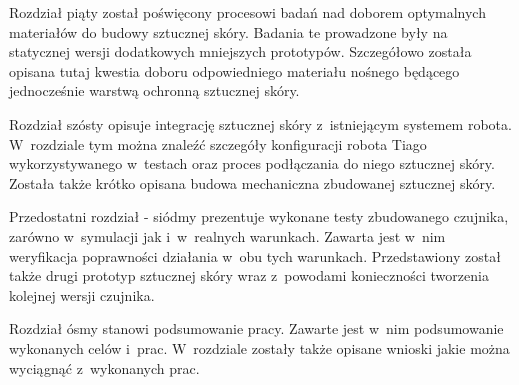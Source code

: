 
Rozdział piąty został poświęcony procesowi badań nad doborem optymalnych materiałów do budowy sztucznej skóry. Badania te prowadzone były na statycznej wersji dodatkowych mniejszych prototypów. Szczegółowo została opisana tutaj kwestia doboru odpowiedniego materiału nośnego będącego jednocześnie warstwą ochronną sztucznej skóry.

Rozdział szósty opisuje integrację sztucznej skóry z~istniejącym systemem robota. W~rozdziale tym można znaleźć szczegóły konfiguracji robota Tiago wykorzystywanego w~testach oraz proces podłączania do niego sztucznej skóry. Została także krótko opisana budowa mechaniczna zbudowanej sztucznej skóry.

Przedostatni rozdział - siódmy prezentuje wykonane testy zbudowanego czujnika, zarówno w~symulacji jak i~w~realnych warunkach. Zawarta jest w~nim weryfikacja poprawności działania w~obu tych warunkach. Przedstawiony został także drugi prototyp sztucznej skóry wraz z~powodami konieczności tworzenia kolejnej wersji czujnika.

Rozdział ósmy stanowi podsumowanie pracy. Zawarte jest w~nim podsumowanie wykonanych celów i~prac. W~rozdziale zostały także opisane wnioski jakie można wyciągnąć z~wykonanych prac.
